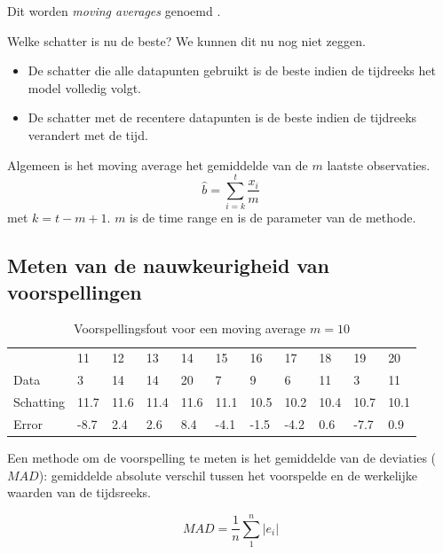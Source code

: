 Dit worden \textit{moving averages} genoemd . 

Welke schatter is nu de beste? We kunnen dit nu nog niet zeggen. 
\begin{itemize}
	\item De schatter die alle datapunten gebruikt is de beste indien de tijdreeks het model volledig volgt.
	\item De schatter met de recentere datapunten is de beste indien de tijdreeks verandert met de tijd.
\end{itemize}

\begin{definition}
	Algemeen is het moving average het gemiddelde van de $m$ laatste observaties.
	\begin{equation}
		\widehat{b} = \sum_{i=k}^{t} \frac{x_{i}}{m}
	\label{eq:movingAverage}
	\end{equation}
	met $k = t-m+1$. $m$ is de time range en is de parameter van de methode.
\end{definition}

\pagebreak
\subsection{Meten van de nauwkeurigheid van voorspellingen}

\begin{table}[h]
	\begin{tabular}{|lllllllllll|}
		\hline
		~         & 11   & 12   & 13   & 14   & 15   & 16   & 17   & 18   & 19   & 20   \\
		Data      & 3    & 14   & 14   & 20   & 7    & 9    & 6    & 11   & 3    & 11   \\
		Schatting & 11.7 & 11.6 & 11.4 & 11.6 & 11.1 & 10.5 & 10.2 & 10.4 & 10.7 & 10.1 \\
		Error     & -8.7 & 2.4  & 2.6  & 8.4  & -4.1 & -1.5 & -4.2 & 0.6  & -7.7 & 0.9  \\ \hline
	\end{tabular}
	\caption{Voorspellingsfout voor een moving average $m = 10$}
	\label{tab:error}
\end{table}


Een methode om de voorspelling te meten is het gemiddelde van de deviaties ($MAD$): gemiddelde absolute verschil tussen het voorspelde en de werkelijke waarden van de tijdsreeks.

\begin{definition}[$MAD$]
\begin{equation}
	MAD = \frac{1}{n} \sum_{1}^{n} \left| e_{i} \right|  
\label{eq:MAD}
\end{equation}
\end{definition}

